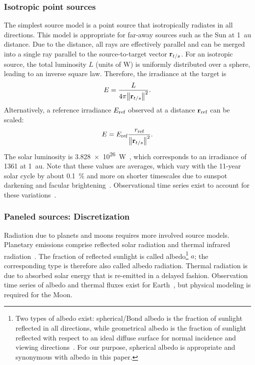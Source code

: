 \subsubsection{Isotropic point sources}
The simplest source model is a point source that isotropically radiates in all directions. This model is appropriate for far-away sources such as the Sun at \qty{1}{\astronomicalunit} distance. Due to the distance, all rays are effectively parallel and can be merged into a single ray parallel to the source-to-target vector $\vb r_{t/s}$. For an isotropic source, the total luminosity $L$ (units of \unit{\W}) is uniformly distributed over a sphere, leading to an inverse square law. Therefore, the irradiance at the target is
\begin{align}
    \label{eq:irradiance-point-luminosity}
    E = \frac{L}{4\pi\norm{\vb r_{t/s}}^2}.
\end{align}
Alternatively, a reference irradiance $E_\textnormal{ref}$ observed at a distance $\vb r_\textnormal{ref}$ can be scaled:
\begin{align}
    E = E_\textnormal{ref} \frac{r_\textnormal{ref}}{\norm{\vb r_{t/s}}^2}.
\end{align}
The solar luminosity is \qty{3.828e26}{\W}~\cite{Prsa2016}, which corresponds to an irradiance of \qty{1361}{\irr} at \qty{1}{\astronomicalunit}. Note that these values are averages, which vary with the 11-year solar cycle by about \qty{0.1}{\percent} and more on shorter timescales due to sunspot darkening and facular brightening~\cite{Kopp2016}. Observational time series exist to account for these variations~\cite{Dewitte2017}.

\subsubsection{Paneled sources: Discretization}
Radiation due to planets and moons requires more involved source models. Planetary emissions comprise reflected solar radiation and thermal infrared radiation~\cite{Knocke1988}. The fraction of reflected sunlight is called albedo\footnote{Two types of albedo exist: spherical/Bond albedo is the fraction of sunlight reflected in all directions, while geometrical albedo is the fraction of sunlight reflected with respect to an ideal diffuse surface for normal incidence and viewing directions~\cite{Heiken1991}. For our purpose, spherical albedo is appropriate and synonymous with albedo in this paper.} $a$; the corresponding type is therefore also called albedo radiation. Thermal radiation is due to absorbed solar energy that is re-emitted in a delayed fashion. Observation time series of albedo and thermal fluxes exist for Earth~\cite{Dewitte2017}, but physical modeling is required for the Moon.

